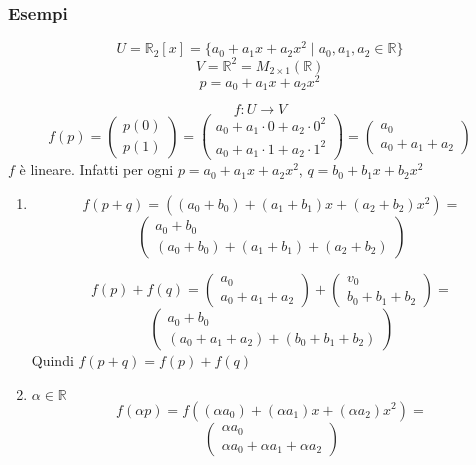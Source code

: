 \documentclass[a4paper]{article}
\theoremstyle{break}
\theoremstyle{break}
\theoremstyle{break}
\theoremstyle{break}
\begin{document}
\subsubsection{Esempi}
\begin{example}
  \[
    U = \mathbb{R}_2[x] = \{a_0+a_1x+a_2x^2 \;|\; a_0,a_1,a_2 \in \mathbb{R}\} 
  \] 
  \[
    V = \mathbb{R}^2 = M_{2 \times 1}(\mathbb{R})
  \] 
  \[
  p = a_0 + a_1x+a_2x^2
  \] 

  \[
  f: U \to V
\]
  \[
  f(p) = \begin{pmatrix} p(0)\\p(1) \end{pmatrix} =
  \begin{pmatrix} 
    a_0 + a_1 \cdot 0 + a_2 \cdot 0^2\\
    a_0 + a_1 \cdot 1 + a_2 \cdot 1^2
  \end{pmatrix} =
  \begin{pmatrix} 
    a_0 \\
    a_0 + a_1 + a_2
  \end{pmatrix} 
  \] 
  \( f \) è lineare. Infatti per ogni \( p=a_0+a_1x+a_2x^2 \), \( q=b_0+b_1x+b_2x^2 \)
  \begin{enumerate}
    \item \[ f(p+q) = \left( (a_0 + b_0) + (a_1+b_1)x + (a_2+b_2)x^2 \right) = \]
      \[
      \begin{pmatrix} 
        a_0+b_0\\
        (a_0+b_0) + (a_1+b_1) + (a_2 + b_2)
      \end{pmatrix} 
      \] 

      \vspace{1em}
      \[
        f(p) + f(q) = \begin{pmatrix} 
          a_0\\
          a_0 + a_1 + a_2
        \end{pmatrix} 
        +
        \begin{pmatrix} 
          v_0\\
          b_0 + b_1 + b_2
        \end{pmatrix} 
        =
      \] 
      \[
        \begin{pmatrix} 
          a_0 + b_0\\
          (a_0+a_1+a_2) + (b_0+b_1+b_2)
        \end{pmatrix} 
      \] 
      Quindi \( f(p+q) = f(p) + f(q) \) 

    \item \( \alpha \in \mathbb{R} \)
      \[
      f(\alpha p) = f((\alpha a_0) + (\alpha a_1)x + (\alpha a_2)x^2 ) =
      \] 
      \[
      \begin{pmatrix} 
        \alpha a_0\\
        \alpha a_0 + \alpha a_1 + \alpha a_2
      \end{pmatrix} 
      \] 


\end{enumerate}
\end{example}
\end{document}
